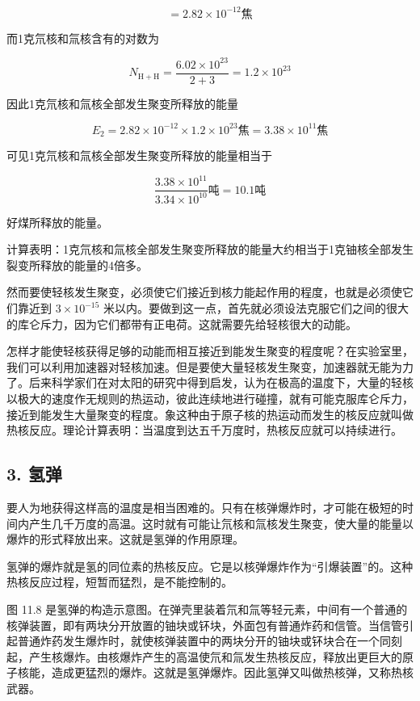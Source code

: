 \[
= 2.82 \times 10 ^ {- 12} \text{焦}
\]

而1克氘核和氚核含有的对数为

\[
N _ {\mathrm{H} + \mathrm{H}} = \frac {6.02 \times 10 ^ {23}}{2 + 3} = 1.2 \times 10 ^ {23}
\]

因此1克氘核和氚核全部发生聚变所释放的能量

\[
E _ {2} = 2.82 \times 10 ^ {- 12} \times 1.2 \times 10 ^ {23} \text{焦} = 3.38 \times 10 ^ {11} \text{焦}
\]

可见1克氘核和氚核全部发生聚变所释放的能量相当于

\[
\frac {3.38 \times 10 ^ {11}}{3.34 \times 10 ^ {10}} \text{吨}=10.1\text{吨}
\]

好煤所释放的能量。

计算表明：1克氘核和氚核全部发生聚变所释放的能量大约相当于1克铀核全部发生裂变所释放的能量的4倍多。

然而要使轻核发生聚变，必须使它们接近到核力能起作用的程度，也就是必须使它们靠近到
\(3 \times 10^{-15}\)
米以内。要做到这一点，首先就必须设法克服它们之间的很大的库仑斥力，因为它们都带有正电荷。这就需要先给轻核很大的动能。

怎样才能使轻核获得足够的动能而相互接近到能发生聚变的程度呢？在实验室里，我们可以利用加速器对轻核加速。但是要使大量轻核发生聚变，加速器就无能为力了。后来科学家们在对太阳的研究中得到启发，认为在极高的温度下，大量的轻核以极大的速度作无规则的热运动，彼此连续地进行碰撞，就有可能克服库仑斥力，接近到能发生大量聚变的程度。象这种由于原子核的热运动而发生的核反应就叫做热核反应。理论计算表明：当温度到达五千万度时，热核反应就可以持续进行。

\subsection{3. 氢弹}

要人为地获得这样高的温度是相当困难的。只有在核弹爆炸时，才可能在极短的时间内产生几千万度的高温。这时就有可能让氘核和氚核发生聚变，使大量的能量以爆炸的形式释放出来。这就是氢弹的作用原理。

氢弹的爆炸就是氢的同位素的热核反应。它是以核弹爆炸作为``引爆装置''的。这种热核反应过程，短暂而猛烈，是不能控制的。

图 11.8
是氢弹的构造示意图。在弹壳里装着氘和氚等轻元素，中间有一个普通的核弹装置，即有两块分开放置的铀块或钚块，外面包有普通炸药和信管。当信管引起普通炸药发生爆炸时，就使核弹装置中的两块分开的铀块或钚块合在一个同刻起，产生核爆炸。由核爆炸产生的高温使氘和氚发生热核反应，释放出更巨大的原子核能，造成更猛烈的爆炸。这就是氢弹爆炸。因此氢弹又叫做热核弹，又称热核武器。

